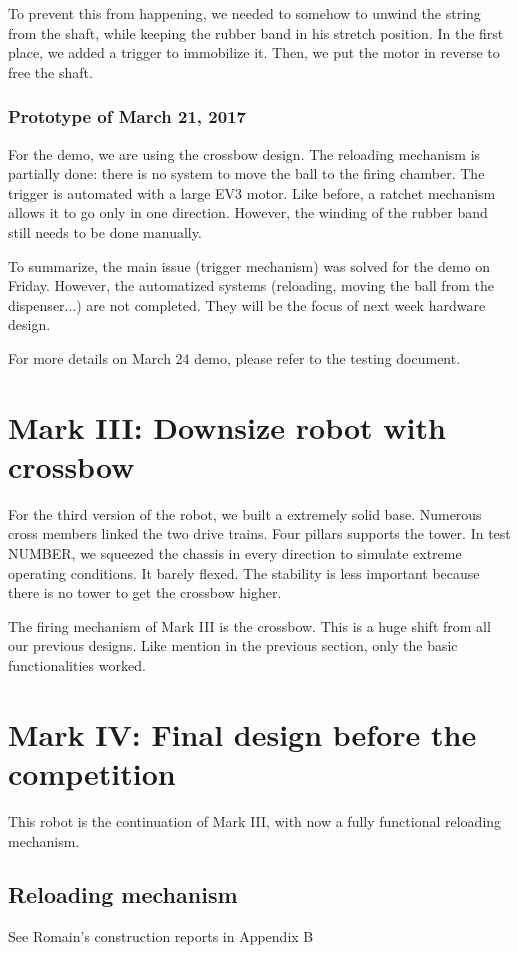 \documentclass[]{article}
\begin{document}
To prevent this from happening, we needed to somehow to unwind the string from the shaft, while keeping the rubber band in his stretch position.  In the first place, we added a trigger to immobilize it.  Then, we put the motor in reverse to free the shaft.


\subsubsection{Prototype of March 21, 2017}
For the demo, we are using the crossbow design.  The reloading mechanism is partially done: there is no system to move the ball to the firing chamber.  
The trigger is automated with a large EV3 motor.  Like before, a ratchet mechanism allows it to go only in  one direction.  However, the winding of the rubber band still needs to be done manually.

To summarize, the main issue (trigger mechanism) was solved for the demo on Friday.  However, the automatized systems (reloading, moving the ball from the dispenser...) are not completed.  They will be the focus of next week hardware design.  

For more details on March 24 demo, please refer to the testing document.





\newpage
\section{Mark III: Downsize robot with crossbow}
For the third version of the robot, we built a extremely solid base.  Numerous cross members linked the two drive trains.  Four pillars supports the tower. In test NUMBER, we squeezed the chassis in every direction to simulate extreme operating conditions.  It barely flexed.  The stability is less important because there is no tower to get the crossbow higher. 

The firing mechanism of Mark III is the crossbow.  This is a huge shift from all our previous designs.  Like mention in the previous section, only the basic functionalities worked.     


\section{Mark IV: Final design before the competition}
This robot is the continuation of Mark III, with now a fully functional reloading mechanism.  
\subsection{Reloading mechanism}
See Romain's construction reports in Appendix B
\end{document}
